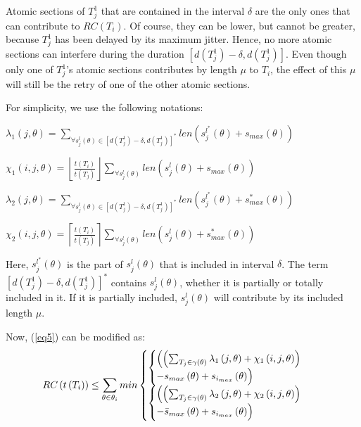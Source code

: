 \documentclass{sig-alternate}
\begin{document}
Atomic sections of $T_{j}^{1}$ that are contained in the interval $\delta$
are the only ones that can contribute to $RC(T_{i})$. Of course, they can be lower, but cannot be greater, because $T_{j}^{1}$ has been delayed by its maximum jitter. Hence, no more atomic sections
can interfere during the duration 
$[d(T_{j}^{1})-\delta,d(T_{j}^{1})]$. Even though only one of $T_j^1$'s atomic sections contributes by length $\mu$ to $T_i$, the effect of this $\mu$ will still be the retry of one of the other atomic sections. 

For simplicity, we use the following notations:
\begin{compactitem}
\item $\lambda_{1}\left(j,\theta\right)=\sum_{\forall s_{j}^{l}\left(\theta\right)\in\left[d\left(T_{j}^{1}\right)-\delta,d\left(T_{j}^{1}\right)\right]^{*}}len\left(s_{j}^{l^{*}}\left(\theta\right)+s_{max}\left(\theta\right)\right)$
\item $\chi_{1}\left(i,j,\theta\right)=\left\lfloor\frac{t\left(T_{i}\right)}{t\left(T_{j}\right)}\right\rfloor\sum_{\forall s_{j}^{l}\left(\theta\right)}len\left(s_{j}^{l}\left(\theta\right)+s_{max}\left(\theta\right)\right)$
\item $\lambda_{2}\left(j,\theta\right)=\sum_{\forall s_{j}^{l}\left(\theta\right)\in\left[d\left(T_{j}^{1}\right)-\delta,d\left(T_{j}^{1}\right)\right]^{*}}len\left(s_{j}^{l^{*}}\left(\theta\right)+s_{max}^{*}\left(\theta\right)\right)$
\item $\chi_{2}\left(i,j,\theta\right)=\left\lceil\frac{t\left(T_{i}\right)}{t\left(T_{j}\right)}\right\rceil\sum_{\forall s_{j}^{l}\left(\theta\right)}len\left(s_{j}^{l}\left(\theta\right)+s_{max}^{*}\left(\theta\right)\right)$
\end{compactitem}
Here, $s_{j}^{l^{*}}\left(\theta\right)$ is the part of $s_{j}^{l}\left(\theta\right)$ that
is included in interval $\delta$. The term $\left[d\left(T_{j}^{1}\right)-\delta,d\left(T_{j}^{1}\right)\right]^{*}$ contains $s_{j}^{l}\left(\theta\right)$, whether it is partially or totally included in it. If it is partially included, $s_{j}^{l}(\theta)$
will contribute by its included length $\mu$.

Now, (\ref{eq5}) can be modified as:
\begin{equation}
RC_{}\left(t\left(T_{i}\right)\right)\le \sum_{\theta\in\theta_{i}}min\begin{cases}
\begin{cases}
\Bigl(\left(\sum_{T_{j}\in\gamma\left(\theta\right)}\lambda_{1}\left(j,\theta\right)+\chi_{1}\left(i,j,\theta\right)\right)\\
-s_{max}\left(\theta\right)+s_{i_{max}}\left(\theta\right)\Bigr)\end{cases}\\
\begin{cases}
\Bigl(\left(\sum_{T_{j}\in\gamma\left(\theta\right)}\lambda_{2}\left(j,\theta\right)+\chi_{2}\left(i,j,\theta\right)\right)\\
-\bar{s}_{max}\left(\theta\right)+s_{i_{max}}\left(\theta\right)\Bigr)\end{cases}\end{cases}\label{eq15}\end{equation}
\end{document}
